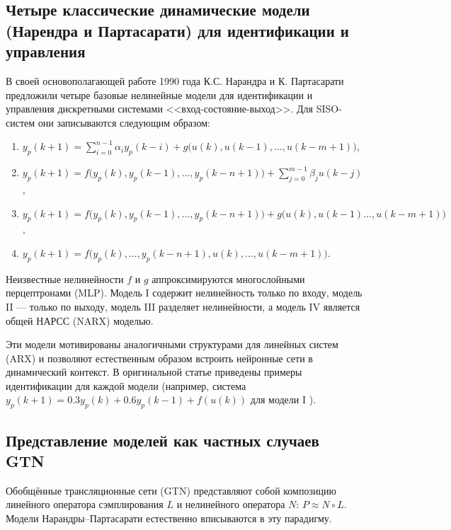 \documentclass[../NDCNNAI_main.tex]{subfiles}
\begin{document}
\subsection{Четыре классические динамические модели (Нарендра и Партасарати) для идентификации и управления}

В своей основополагающей работе 1990 года К.С. Нарандра и К. Партасарати предложили четыре базовые нелинейные модели для идентификации и управления дискретными системами <<вход-состояние-выход>>. Для SISO-систем они записываются следующим образом:
\begin{enumerate}[label=М \Roman*:]
    \item $y_p(k+1) = \sum_{i=0}^{n-1} \alpha_i y_p(k-i) + g\big(u(k), u(k-1), \dots, u(k-m+1)\big)$,
    \item $y_p(k+1) = f\big(y_p(k), y_p(k-1), \dots, y_p(k-n+1)\big) + \sum_{j=0}^{m-1} \beta_j u(k-j)$,
    \item $y_p(k+1) = f\big(y_p(k), y_p(k-1), \dots, y_p(k-n+1)\big) + g\big(u(k), u(k-1) \dots, u(k-m+1)\big)$,
    \item $y_p(k+1) = f\big(y_p(k), \dots, y_p(k-n+1), u(k), \dots, u(k-m+1)\big)$.
\end{enumerate}

Неизвестные нелинейности \(f\) и \(g\) аппроксимируются многослойными перцептронами (MLP). Модель I содержит нелинейность только по входу, модель II --- только по выходу, модель III разделяет нелинейности, а модель IV является общей НАРСС (NARX) моделью.

Эти модели мотивированы аналогичными структурами для линейных систем (ARX) и позволяют естественным образом встроить нейронные сети в динамический контекст. В оригинальной статье приведены примеры идентификации для каждой модели (например, система \(y_p(k+1) = 0.3y_p(k) + 0.6y_p(k-1) + f(u(k))\) для модели I \cite{Narendra1990}).

\subsection{Представление моделей как частных случаев GTN}

Обобщённые трансляционные сети (GTN) представляют собой композицию линейного оператора сэмплирования \(L\) и нелинейного оператора \(N\): \(P \approx N \circ L\). Модели Нарандры–Партасарати естественно вписываются в эту парадигму.
\end{document}
